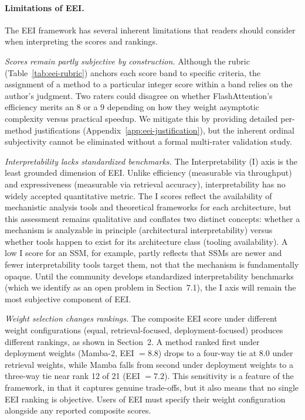\documentclass[10pt,twocolumn]{article}
\begin{document}
\paragraph{Limitations of EEI.}
The EEI framework has several inherent limitations that readers should consider when interpreting the scores and rankings.

\textit{Scores remain partly subjective by construction.} Although the rubric (Table~\ref{tab:eei-rubric}) anchors each score band to specific criteria, the assignment of a method to a particular integer score within a band relies on the author's judgment. Two raters could disagree on whether FlashAttention's efficiency merits an 8 or a 9 depending on how they weight asymptotic complexity versus practical speedup. We mitigate this by providing detailed per-method justifications (Appendix~\ref{app:eei-justification}), but the inherent ordinal subjectivity cannot be eliminated without a formal multi-rater validation study.

\textit{Interpretability lacks standardized benchmarks.} The Interpretability (I) axis is the least grounded dimension of EEI. Unlike efficiency (measurable via throughput) and expressiveness (measurable via retrieval accuracy), interpretability has no widely accepted quantitative metric. The I scores reflect the availability of mechanistic analysis tools and theoretical frameworks for each architecture, but this assessment remains qualitative and conflates two distinct concepts: whether a mechanism is analyzable in principle (architectural interpretability) versus whether tools happen to exist for its architecture class (tooling availability). A low I score for an SSM, for example, partly reflects that SSMs are newer and fewer interpretability tools target them, not that the mechanism is fundamentally opaque. Until the community develops standardized interpretability benchmarks (which we identify as an open problem in Section~7.1), the I axis will remain the most subjective component of EEI.

\textit{Weight selection changes rankings.} The composite EEI score under different weight configurations (equal, retrieval-focused, deployment-focused) produces different rankings, as shown in Section~2. A method ranked first under deployment weights (Mamba-2, EEI $= 8.8$) drops to a four-way tie at 8.0 under retrieval weights, while Mamba falls from second under deployment weights to a three-way tie near rank 12 of 21 (EEI $= 7.2$). This sensitivity is a feature of the framework, in that it captures genuine trade-offs, but it also means that no single EEI ranking is objective. Users of EEI must specify their weight configuration alongside any reported composite scores.
\end{document}
